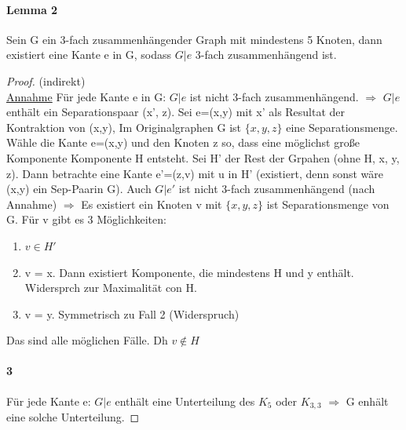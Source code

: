 \paragraph{Lemma 2} Sein G ein 3-fach zusammenhängender Graph mit mindestens 5 Knoten, dann existiert eine Kante e in G, sodass $ G|e $ 3-fach zusammenhängend ist.

\begin{proof}(indirekt) \\
\underline{Annahme} Für jede Kante e in G: $ G|e $ ist nicht 3-fach zusammenhängend. $ \Rightarrow $ $ G|e $ enthält ein Separationspaar (x', z). Sei e=(x,y) mit x' als Resultat der Kontraktion von (x,y), Im Originalgraphen G ist $ \{x,y,z \} $ eine Separationsmenge. Wähle die Kante e=(x,y) und den Knoten z so, dass eine möglichst große Komponente Komponente H entsteht. Sei H' der Rest der Grpahen (ohne H, x, y, z). Dann betrachte eine Kante e'=(z,v) mit u in H' (existiert, denn sonst wäre (x,y) ein Sep-Paarin G). Auch $ G|e' $ ist nicht 3-fach zusammenhängend (nach Annahme) $ \Rightarrow $ Es existiert ein Knoten v mit  $ \{x,y,z \} $ ist Separationsmenge von G. Für v gibt es 3 Möglichkeiten:
\begin{enumerate}
    \item $ v \in H' $
    \item v = x. Dann existiert Komponente, die mindestens H und y enthält. Widersprch zur Maximalität con H.
    \item v = y. Symmetrisch zu Fall 2 (Widerspruch)
\end{enumerate}
Das sind alle möglichen Fälle. Dh $ v \notin H $

\paragraph{3} Für jede Kante e: $ G|e $ enthält eine Unterteilung des $ K_5 $ oder $ K_{3,3} $ $ \Rightarrow $ G enhält eine solche Unterteilung. 

\end{proof}




 
